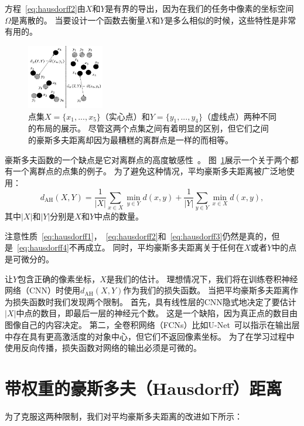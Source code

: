 \documentclass[10pt,twocolumn,letterpaper,UTF8]{article}
\begin{document}
方程~\eqref{eq:hausdorff2}由$X$和$Y$是有界的导出，因为在我们的任务中像素的坐标空间 $\Omega $是离散的。
当要设计一个函数去衡量$X$和$Y$是多么相似的时候，这些特性是非常有用的。

\begin{figure}[t]
  \centering
  \includegraphics[width=0.3\textwidth]{fig/points.png}%

  \caption{点集$X=\{x_1, ..., x_5\}$（实心点）和$Y=\{y_1, ..., y_4\}$（虚线点）两种不同的布局的展示。
          尽管这两个点集之间有着明显的区别，但它们之间的豪斯多夫距离却因为最糟糕的离群点是一样的而相等。}
  \label{fig:points}
\end{figure}

豪斯多夫函数的一个缺点是它对离群点的高度敏感性~\cite{schutze2012,taha2015}。
图~\ref{fig:points}展示一个关于两个都有一个离群点的点集的例子。
为了避免这种情况，平均豪斯多夫距离被广泛地使用：
\begin{equation}
  \label{eq:AH}
  d_{\text{AH}}(X, Y) = \frac{1}{|X|} \sum_{x\in X} \min_{y\in Y} d(x, y) + \frac{1}{|Y|} \sum_{y\in Y} \min_{x\in X} d(x, y) ,
\end{equation}
其中$|X|$和$|Y|$分别是$X$和$Y$中点的数量。 

注意性质~\eqref{eq:hausdorff1}，~\eqref{eq:hausdorff2}和~\eqref{eq:hausdorff3}仍然是真的，但是~\eqref{eq:hausdorff4}不再成立。
同时，平均豪斯多夫距离关于任何在$X$或者$Y$中的点是可微分的。

让$Y$包含正确的像素坐标，$X$是我们的估计。
理想情况下，我们将在训练卷积神经网络（CNN）时使用$d_{\text{AH}}(X, Y)$作为我们的损失函数。
当把平均豪斯多夫距离作为损失函数时我们发现两个限制。
首先，具有线性层的CNN隐式地决定了要估计$|X|$中点的数目，即最后一层的神经元个数。
这是一个缺陷，因为真正点的数目由图像自己的内容决定。
第二，全卷积网络（FCNs）比如U-Net~\cite{unet}可以指示在输出层中存在具有更高激活度的对象中心，但它们不返回像素坐标。
为了在学习过程中使用反向传播，损失函数对网络的输出必须是可微的。

\section{带权重的豪斯多夫（Hausdorff）距离}
\label{sec:whd}
为了克服这两种限制，我们对平均豪斯多夫距离的改进如下所示：
\end{document}
